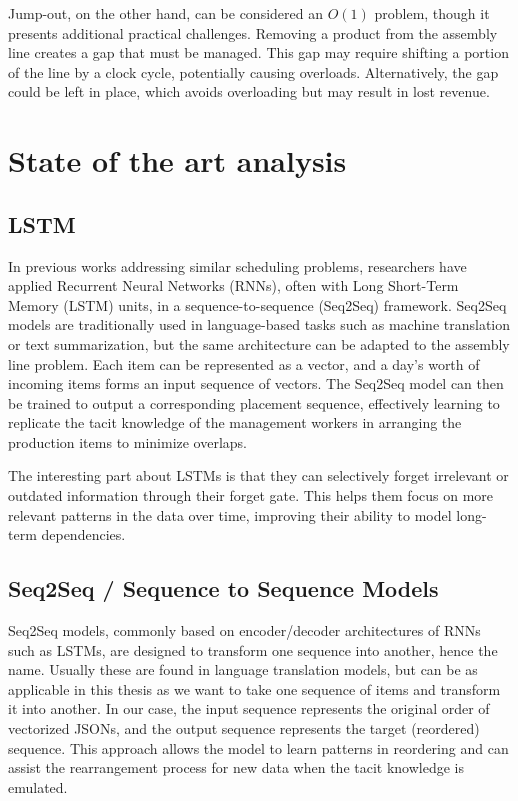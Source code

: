 \documentclass[12pt,a4paper]{report}
\begin{document}
Jump-out, on the other hand, can be considered an $O(1)$ problem, though it presents additional practical challenges. Removing a product from the assembly line creates a gap that must be managed. This gap may require shifting a portion of the line by a clock cycle, potentially causing overloads. Alternatively, the gap could be left in place, which avoids overloading but may result in lost revenue.

\chapter{State of the art analysis}
\section{LSTM}

In previous works addressing similar scheduling problems, researchers have applied Recurrent Neural Networks (RNNs), often with Long Short-Term Memory (LSTM) units, in a sequence-to-sequence (Seq2Seq) framework. Seq2Seq models are traditionally used in language-based tasks such as machine translation or text summarization, but the same architecture can be adapted to the assembly line problem.\cite{ref2} Each item can be represented as a vector, and a day’s worth of incoming items forms an input sequence of vectors. The Seq2Seq model can then be trained to output a corresponding placement sequence, effectively learning to replicate the tacit knowledge of the management workers in arranging the production items to minimize overlaps.\cite{ref3} 

The interesting part about LSTMs is that they can selectively forget irrelevant or outdated information through their forget gate. This helps them focus on more relevant patterns in the data over time, improving their ability to model long-term dependencies. \cite{ref4}


\section{Seq2Seq / Sequence to Sequence Models}
Seq2Seq models, commonly based on encoder/decoder architectures of RNNs such as LSTMs, are designed to transform one sequence into another, hence the name. Usually these are found in language translation models, but can be as applicable in this thesis as we want to take one sequence of items and transform it into another. In our case, the input sequence represents the original order of vectorized JSONs, and the output sequence represents the target (reordered) sequence. \cite{ref2}\cite{ref3} This approach allows the model to learn patterns in reordering and can assist the rearrangement process for new data when the tacit knowledge is emulated. 
\end{document}
